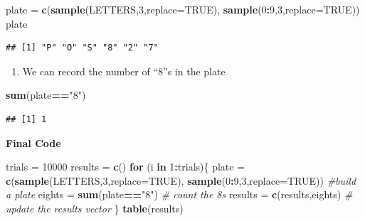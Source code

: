 \documentclass[
]{book}
\newenvironment{Shaded}{\begin{snugshade}}{\end{snugshade}}
\newcommand{\AttributeTok}[1]{\textcolor[rgb]{0.13,0.29,0.53}{#1}}
\newcommand{\CommentTok}[1]{\textcolor[rgb]{0.56,0.35,0.01}{\textit{#1}}}
\newcommand{\ConstantTok}[1]{\textcolor[rgb]{0.56,0.35,0.01}{#1}}
\newcommand{\ControlFlowTok}[1]{\textcolor[rgb]{0.13,0.29,0.53}{\textbf{#1}}}
\newcommand{\DecValTok}[1]{\textcolor[rgb]{0.00,0.00,0.81}{#1}}
\newcommand{\FunctionTok}[1]{\textcolor[rgb]{0.13,0.29,0.53}{\textbf{#1}}}
\newcommand{\NormalTok}[1]{#1}
\newcommand{\OtherTok}[1]{\textcolor[rgb]{0.56,0.35,0.01}{#1}}
\newcommand{\SpecialCharTok}[1]{\textcolor[rgb]{0.81,0.36,0.00}{\textbf{#1}}}
\newcommand{\StringTok}[1]{\textcolor[rgb]{0.31,0.60,0.02}{#1}}
\providecommand{\tightlist}{%
  \setlength{\itemsep}{0pt}\setlength{\parskip}{0pt}}
\theoremstyle{definition}
\theoremstyle{definition}
\theoremstyle{definition}
\theoremstyle{definition}
\theoremstyle{remark}
\begin{document}
\begin{Shaded}
\begin{Highlighting}[]
\NormalTok{plate }\OtherTok{=} \FunctionTok{c}\NormalTok{(}\FunctionTok{sample}\NormalTok{(LETTERS,}\DecValTok{3}\NormalTok{,}\AttributeTok{replace=}\ConstantTok{TRUE}\NormalTok{),}
          \FunctionTok{sample}\NormalTok{(}\DecValTok{0}\SpecialCharTok{:}\DecValTok{9}\NormalTok{,}\DecValTok{3}\NormalTok{,}\AttributeTok{replace=}\ConstantTok{TRUE}\NormalTok{))}
\NormalTok{plate}
\end{Highlighting}
\end{Shaded}

\begin{verbatim}
## [1] "P" "O" "S" "8" "2" "7"
\end{verbatim}

\begin{enumerate}
\def\labelenumi{\arabic{enumi}.}
\setcounter{enumi}{1}
\tightlist
\item
  We can record the number of ``8''s in the plate
\end{enumerate}

\begin{Shaded}
\begin{Highlighting}[]
\FunctionTok{sum}\NormalTok{(plate}\SpecialCharTok{==}\StringTok{"8"}\NormalTok{)}
\end{Highlighting}
\end{Shaded}

\begin{verbatim}
## [1] 1
\end{verbatim}

\textbf{Final Code}

\begin{Shaded}
\begin{Highlighting}[]
\NormalTok{trials }\OtherTok{=} \DecValTok{10000}
\NormalTok{results }\OtherTok{=} \FunctionTok{c}\NormalTok{()}
\ControlFlowTok{for}\NormalTok{ (i }\ControlFlowTok{in} \DecValTok{1}\SpecialCharTok{:}\NormalTok{trials)\{}
\NormalTok{  plate }\OtherTok{=} \FunctionTok{c}\NormalTok{(}\FunctionTok{sample}\NormalTok{(LETTERS,}\DecValTok{3}\NormalTok{,}\AttributeTok{replace=}\ConstantTok{TRUE}\NormalTok{),}
            \FunctionTok{sample}\NormalTok{(}\DecValTok{0}\SpecialCharTok{:}\DecValTok{9}\NormalTok{,}\DecValTok{3}\NormalTok{,}\AttributeTok{replace=}\ConstantTok{TRUE}\NormalTok{)) }\CommentTok{\#build a plate}
\NormalTok{  eights }\OtherTok{=} \FunctionTok{sum}\NormalTok{(plate}\SpecialCharTok{==}\StringTok{"8"}\NormalTok{) }\CommentTok{\# count the 8s}
\NormalTok{  results }\OtherTok{=} \FunctionTok{c}\NormalTok{(results,eights) }\CommentTok{\# update the results vector}
\NormalTok{\}}
\FunctionTok{table}\NormalTok{(results)}
\end{Highlighting}
\end{Shaded}
\end{document}
